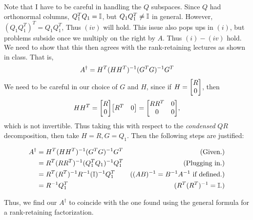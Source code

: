 \begin{solution}
    Note that I have to be careful in handling the $Q$ subspaces. Since $Q$ had orthonormal columns, $Q_1^T Q_1 = \mathbb{I}$, but $Q_1Q_1^T \neq \mathbb{I}$ in general. However, $(Q_1Q_1^T)^T = Q_1Q_1^T$, Thus $(iv)$ will hold. This issue also pops ups in $(i)$, but problems subside once we multiply on the right by $A$. Thus $(i) - (iv)$ hold. We need to show that this then agrees with the rank-retaining lectures as shown in class. That is, 
    \[
    A^\dag = H^T(HH^T)^{-1} (G^TG)^{-1} G^T
    \]
    We need to be careful in our choice of $G$ and $H$, since if $H = \mqty[R\\0]$, then 
    \[
    HH^T = \mqty[R\\0]\mqty[R^T&0] =\mqty[RR^T &0\\0&0],
    \]
    which is not invertible. Thus taking this with respect to the \textit{condensed} $QR$ decomposition, then take $H = R, G = Q_1$. Then the following steps are justified:

    \alignbreak
    \begin{align*}
        A^\dag &= H^T(HH^T)^{-1} (G^TG)^{-1} G^T &\text{(Given.)}\\
        &= R^T(RR^T)^{-1} (Q_1^TQ_1)^{-1} Q_1^T &\text{(Plugging in.)}\\
        &= R^T(R^T)^{-1} R^{-1} (\mathbb{I})^{-1} Q_1^T &\text{($(AB)^{-1} = B^{-1} A^{-1}$ if defined.)}\\
        &= R^{-1} Q_1^T &(R^T(R^T)^{-1} = \mathbb{I}.)
    \end{align*}
    \alignbreak

    Thus, we find our $A^\dag$ to coincide with the one found using the general formula for a rank-retaining factorization.
\end{solution}

\newpage
